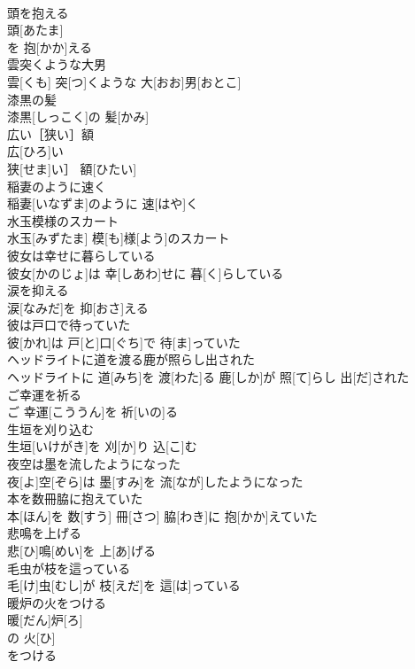 \documentclass[8pt]{extreport}
\begin{document}
\begin{CJK}{UTF8}{min}
\\	頭を抱える	
\\	頭[あたま]
\\	を 抱[かか]える 
\\	雲突くような大男	
\\	雲[くも] 突[つ]くような 大[おお]男[おとこ]
\\	漆黒の髪	
\\	漆黒[しっこく]の 髪[かみ]
\\	広い［狭い］額	
\\	広[ひろ]い
\\	狭[せま]い］ 額[ひたい]
\\	稲妻のように速く	
\\	稲妻[いなずま]のように 速[はや]く
\\	水玉模様のスカート	
\\	水玉[みずたま] 模[も]様[よう]のスカート
\\	彼女は幸せに暮らしている	
\\	彼女[かのじょ]は 幸[しあわ]せに 暮[く]らしている
\\	涙を抑える	
\\	涙[なみだ]を 抑[おさ]える
\\	彼は戸口で待っていた	
\\	彼[かれ]は 戸[と]口[ぐち]で 待[ま]っていた
\\	ヘッドライトに道を渡る鹿が照らし出された	
\\	ヘッドライトに 道[みち]を 渡[わた]る 鹿[しか]が 照[て]らし 出[だ]された
\\	ご幸運を祈る	
\\	ご 幸運[こううん]を 祈[いの]る
\\	生垣を刈り込む	
\\	生垣[いけがき]を 刈[か]り 込[こ]む
\\	夜空は墨を流したようになった	
\\	夜[よ]空[ぞら]は 墨[すみ]を 流[なが]したようになった
\\	本を数冊脇に抱えていた	
\\	本[ほん]を 数[すう] 冊[さつ] 脇[わき]に 抱[かか]えていた
\\	悲鳴を上げる	
\\	悲[ひ]鳴[めい]を 上[あ]げる
\\	毛虫が枝を這っている	
\\	毛[け]虫[むし]が 枝[えだ]を 這[は]っている
\\	暖炉の火をつける	
\\	暖[だん]炉[ろ]
\\	の 火[ひ]
\\	をつける 

\end{CJK}
\end{document}
